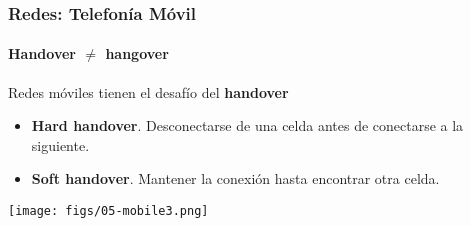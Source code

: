 \documentclass[letter]{beamer}
\begin{document}
\begin{frame}
  \frametitle{Redes: Telefonía Móvil}
  \framesubtitle{Handover $\neq$ hangover}

  Redes móviles tienen el desafío del {\bf handover}
  \begin{itemize}
    \item {\bf Hard handover}. Desconectarse de una celda antes de conectarse a la siguiente.
    \item {\bf Soft handover}. Mantener la conexión hasta encontrar otra celda.
  \end{itemize}
  \begin{center}
    \texttt{[image: figs/05-mobile3.png]}
  \end{center}

\end{frame}
\end{document}

